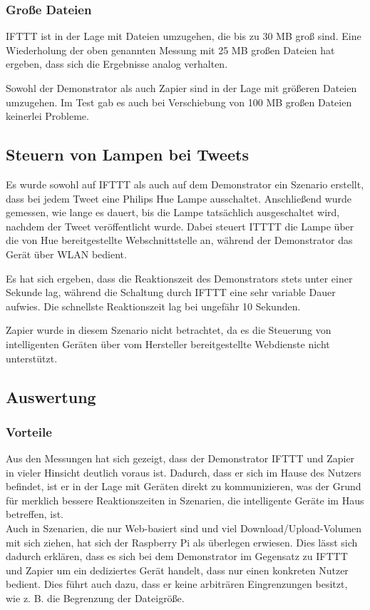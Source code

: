 \subsubsection{Große Dateien}
IFTTT ist in der Lage mit Dateien umzugehen, die bis zu 30 MB groß sind. Eine Wiederholung der oben genannten Messung mit 25 MB großen Dateien hat ergeben, dass sich die Ergebnisse  analog verhalten. 

Sowohl der Demonstrator als auch Zapier sind in der Lage mit größeren Dateien umzugehen. Im Test gab es auch bei Verschiebung von 100 MB großen Dateien keinerlei Probleme.

\subsection{Steuern von Lampen bei Tweets}
Es wurde sowohl auf IFTTT als auch auf dem Demonstrator ein Szenario erstellt, dass bei jedem Tweet eine Philips Hue Lampe ausschaltet. Anschließend wurde gemessen, wie lange es dauert, bis die Lampe tatsächlich ausgeschaltet wird, nachdem der Tweet veröffentlicht wurde. Dabei steuert ITTTT die Lampe über die von Hue bereitgestellte Webschnittstelle an, während der Demonstrator das Gerät über WLAN bedient.

Es hat sich ergeben, dass die Reaktionszeit des Demonstrators stets unter einer Sekunde lag, während die Schaltung durch IFTTT eine sehr variable Dauer aufwies. Die schnellste Reaktionszeit lag bei ungefähr 10 Sekunden.

Zapier wurde in diesem Szenario nicht betrachtet, da es die Steuerung von intelligenten Geräten über vom Hersteller bereitgestellte Webdienste nicht unterstützt.


\subsection{Auswertung}
\subsubsection{Vorteile}
Aus den Messungen hat sich gezeigt, dass der Demonstrator IFTTT und Zapier in vieler Hinsicht deutlich voraus ist. Dadurch, dass er sich im Hause des Nutzers befindet, ist er in der Lage mit Geräten direkt zu kommunizieren, was der Grund für merklich bessere Reaktionszeiten in Szenarien, die intelligente Geräte im Haus betreffen, ist.\\

Auch in Szenarien, die nur Web-basiert sind und viel Download/Upload-Volumen mit sich ziehen, hat sich der Raspberry Pi als überlegen erwiesen. Dies lässt sich dadurch erklären, dass es sich bei dem Demonstrator im Gegensatz zu IFTTT und Zapier um ein dediziertes Gerät handelt, dass nur einen konkreten Nutzer bedient. Dies führt auch dazu, dass er keine arbiträren Eingrenzungen besitzt, wie z. B. die Begrenzung der Dateigröße.

